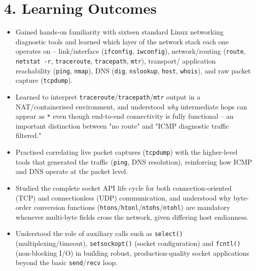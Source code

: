 \documentclass[11pt]{article}
\begin{document}
\section*{4. Learning Outcomes}
\begin{itemize}
  \item Gained hands-on familiarity with sixteen standard Linux networking diagnostic tools and
        learned which layer of the network stack each one operates on -- link/interface
        (\texttt{ifconfig}, \texttt{iwconfig}), network/routing (\texttt{route},
        \texttt{netstat -r}, \texttt{traceroute}, \texttt{tracepath}, \texttt{mtr}), transport/
        application reachability (\texttt{ping}, \texttt{nmap}), DNS (\texttt{dig},
        \texttt{nslookup}, \texttt{host}, \texttt{whois}), and raw packet capture
        (\texttt{tcpdump}).
  \item Learned to interpret \texttt{traceroute}/\texttt{tracepath}/\texttt{mtr} output in a
        NAT/containerised environment, and understood \emph{why} intermediate hops can appear as
        \texttt{*} even though end-to-end connectivity is fully functional -- an important
        distinction between "no route" and "ICMP diagnostic traffic filtered."
  \item Practised correlating live packet captures (\texttt{tcpdump}) with the higher-level
        tools that generated the traffic (\texttt{ping}, DNS resolution), reinforcing how ICMP
        and DNS operate at the packet level.
  \item Studied the complete socket API life cycle for both connection-oriented (TCP) and
        connectionless (UDP) communication, and understood why byte-order conversion functions
        (\texttt{htons}/\texttt{htonl}/\texttt{ntohs}/\texttt{ntohl}) are mandatory whenever
        multi-byte fields cross the network, given differing host endianness.
  \item Understood the role of auxiliary calls such as \texttt{select()} (multiplexing/timeout),
        \texttt{setsockopt()} (socket configuration) and \texttt{fcntl()} (non-blocking I/O) in
        building robust, production-quality socket applications beyond the basic
        \texttt{send}/\texttt{recv} loop.
\end{itemize}
\end{document}
